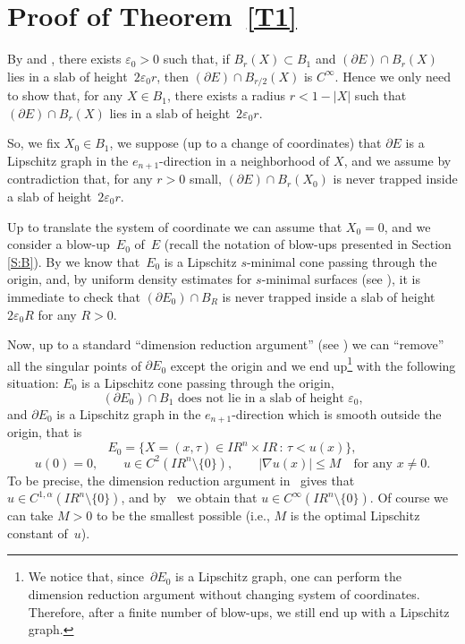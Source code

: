 \documentclass[11pt]{amsart}
\begin{document}
\section{Proof of Theorem~\ref{T1}}\label{S:2}
By \cite[Theorem~6.1]{CRS} and \cite[Theorem 5]{BFV}, there exists ${\varepsilon}_0>0$ such that,
if $B_r(X)\subset B_1$ and $(\partial E)\cap B_r(X)$ lies in a slab of height~$2{\varepsilon}_0r$,
then $(\partial E)\cap B_{r/2}(X)$ is $C^\infty$.
Hence we only need to show that, for any $X \in B_1$, there exists a radius $r<1-|X|$ such that
$(\partial E)\cap B_r(X)$ lies in a slab of height~$2{\varepsilon}_0r$.

So, we fix $X_0 \in B_1$, we suppose (up to a change of coordinates)
that $\partial E$ is a Lipschitz graph in the $e_{n+1}$-direction in a neighborhood of $X$,
and we assume by contradiction that, for any $r>0$ small, 
$(\partial E)\cap B_r(X_0)$ is never trapped inside a slab of height~$2{\varepsilon}_0r$.

Up to translate the system of coordinate we can assume that $X_0=0$,
and we consider a  blow-up~$E_0$ of~$E$ (recall the notation
of blow-ups presented in Section \ref{S:B}).
By \cite[Theorem 9.2]{CRS} we know that~$E_0$
is a Lipschitz $s$-minimal cone passing through the origin,
and, by uniform density estimates for $s$-minimal surfaces (see \cite[Theorem 4.1]{CRS}),
it is immediate to check that 
$(\partial E_0)\cap B_R$ is never trapped inside a slab of height~$2{\varepsilon}_0R$ for any $R>0$.

Now, up to a standard ``dimension reduction argument'' (see \cite[Theorem 10.3]{CRS})
we can ``remove'' all the singular points
of $\partial E_0$ except the origin and we end up\footnote{We notice that,
since~$\partial E_0$ is a Lipschitz graph, one can perform the
dimension reduction argument without changing system of coordinates. Therefore,
after a finite number of blow-ups, we still end up with a Lipschitz graph.}
with the following situation:
$E_0$ is a Lipschitz
cone passing through the origin,
\begin{equation}\label{C2}
{\mbox{$(\partial E_0)\cap B_1$ does not
lie in a slab of height~${\varepsilon}_0$,}}\end{equation}
and $\partial E_0$ is a Lipschitz graph in the $e_{n+1}$-direction which is 
smooth outside the origin, that is
$$ E_0=\big\{ X=(x,\tau)\in{{I\!\!R}}^n\times{{I\!\!R}} \,:\,
\tau<u(x)\big\},$$
\begin{equation}\label{Cinf}
u(0)=0,\qquad
u\in C^2({{I\!\!R}}^n\setminus\{0\}),\qquad  |\nabla u(x)|{\leqslant} M\quad \text{for any~$x\ne0$}.
\end{equation} 
To be precise, the dimension reduction argument in~\cite{CRS}
gives that $u\in C^{1,\alpha}({{I\!\!R}}^n\setminus\{0\})$, and by~\cite[Theorem 1]{BFV} we obtain that
$u\in C^\infty({{I\!\!R}}^n\setminus\{0\})$.
Of course we can take $M>0$ to be the smallest possible (i.e., $M$ is
the optimal Lipschitz constant of~$u$).
\end{document}
